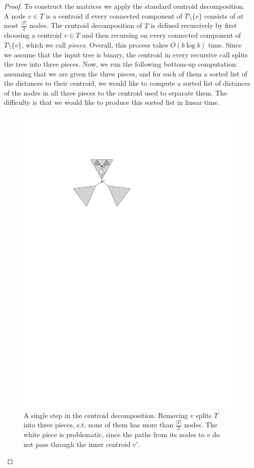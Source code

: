 \documentclass[11pt,a4paper]{article}
\theoremstyle{definition}
\theoremstyle{remark}
\begin{document}
\begin{proof}
To construct the matrices we apply the standard centroid decomposition. A node $v\in T$ is a centroid if every connected component of
$T\setminus\{v\}$ consists of at most $\frac{|T|}{2}$ nodes. The centroid decomposition of $T$ is defined recursively by first choosing a centroid
$v\in T$ and then recursing on every connected component of $T\setminus\{v\}$, which we call \emph{pieces}.
Overall, this process takes $O(b\log b)$ time. Since we assume that the input tree is binary, the centroid in every recursive call splits the tree
into three pieces. Now, we run the following bottom-up computation: assuming that we are given the three pieces, and for each of
them a sorted list of the distances to their centroid, we would like to compute a sorted list of distances of the nodes in all three pieces
to the centroid used to separate them. The difficulty is that we would like to produce this sorted list in linear time.


\begin{figure}[ht]
\begin{center}
\includegraphics[scale=1]{centroid}
\end{center}
\caption{A single step in the centroid decomposition. Removing $v$ splits $T$ into three pieces, s.t. none of them has more than $\frac{|T|}{2}$ nodes. The white piece is problematic, since the paths from its nodes to $v$ do not pass through the inner centroid $v'$.}
\end{figure}



\end{proof}
\end{document}

